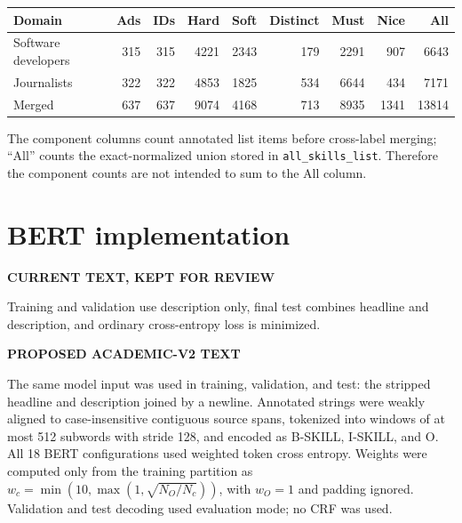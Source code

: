 \documentclass[11pt,a4paper]{article}
\newenvironment{OldBlock}
  {\definecolor{shadecolor}{RGB}{255,230,230}\begin{shaded}\begingroup\textbf{CURRENT TEXT, KEPT FOR REVIEW}\par\color{red!70!black}}
  {\endgroup\end{shaded}}
\newenvironment{NewBlock}
  {\definecolor{shadecolor}{RGB}{199,235,255}\begin{shaded}\begingroup\textbf{PROPOSED ACADEMIC-V2 TEXT}\par\color{newink}}
  {\endgroup\end{shaded}}
\newcommand{\Code}[1]{\texttt{#1}}
\begin{document}
\begin{center}
\small
\begin{tabular}{lrrrrrrrr}
\toprule
Domain & Ads & IDs & Hard & Soft & Distinct & Must & Nice & All \\
\midrule
Software developers & 315 & 315 & 4221 & 2343 & 179 & 2291 & 907 & 6643 \\
Journalists & 322 & 322 & 4853 & 1825 & 534 & 6644 & 434 & 7171 \\
Merged & 637 & 637 & 9074 & 4168 & 713 & 8935 & 1341 & 13814 \\
\bottomrule
\end{tabular}
\end{center}
The component columns count annotated list items before cross-label merging;
``All'' counts the exact-normalized union stored in
\Code{all\_skills\_list}. Therefore the component counts are not intended to
sum to the All column.

\section{BERT implementation}
\begin{OldBlock}
Training and validation use description only, final test combines headline and
description, and ordinary cross-entropy loss is minimized.
\end{OldBlock}
\begin{NewBlock}
The same model input was used in training, validation, and test: the stripped
headline and description joined by a newline. Annotated strings were weakly
aligned to case-insensitive contiguous source spans, tokenized into windows of
at most 512 subwords with stride 128, and encoded as B-SKILL, I-SKILL, and O.
All 18 BERT configurations used weighted token cross entropy. Weights were
computed only from the training partition as
$w_c=\min(10,\max(1,\sqrt{N_O/N_c}))$, with $w_O=1$ and padding ignored.
Validation and test decoding used evaluation mode; no CRF was used.
\end{NewBlock}
\end{document}
